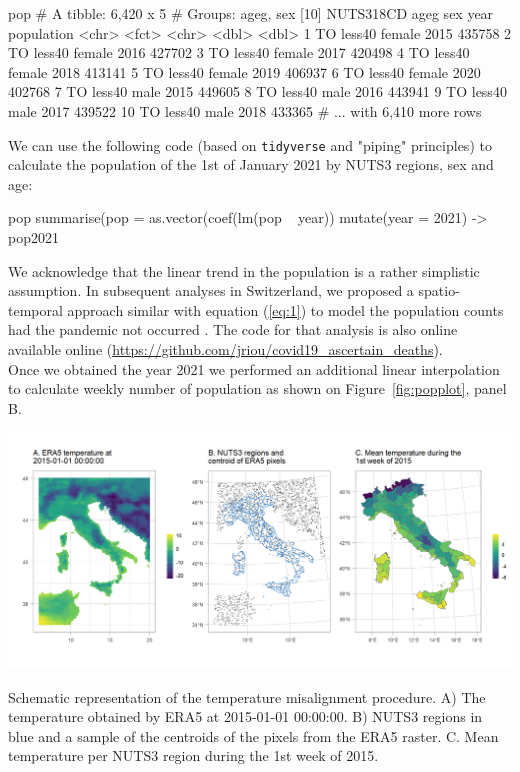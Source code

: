 \begin{example}
pop
# A tibble: 6,420 x 5
# Groups:   ageg, sex [10]
NUTS318CD ageg   sex     year population
<chr>     <fct>  <chr>  <dbl>      <dbl>
1 TO        less40 female  2015     435758
2 TO        less40 female  2016     427702
3 TO        less40 female  2017     420498
4 TO        less40 female  2018     413141
5 TO        less40 female  2019     406937
6 TO        less40 female  2020     402768
7 TO        less40 male    2015     449605
8 TO        less40 male    2016     443941
9 TO        less40 male    2017     439522
10 TO        less40 male    2018     433365
# ... with 6,410 more rows
\end{example}



We can use the following code (based on \texttt{tidyverse} and "piping" principles) to calculate the population of the 1st of January 2021 by NUTS3 regions, sex and age:
\begin{example}
pop %
	summarise(pop = as.vector(coef(lm(pop ~ year)) %
	mutate(year = 2021) -> pop2021
\end{example}

We acknowledge that the linear trend in the population is a rather simplistic assumption. In subsequent analyses in Switzerland, we proposed a spatio-temporal approach similar with equation (\ref{eq:1}) to model the population counts had the pandemic not occurred \citep{riou2023direct}. The code for that analysis is also online available online (\url{https://github.com/jriou/covid19_ascertain_deaths}).\\
Once we obtained the year 2021 we performed an additional linear interpolation to calculate weekly number of population as shown on Figure~\ref{fig:popplot}, panel B.

\begin{widefigure}[!b]
	\centering
	\includegraphics{ERAPOINTS.png}
	\caption{Schematic representation of the temperature misalignment procedure. A) The temperature obtained by ERA5 at 2015-01-01 00:00:00. B) NUTS3 regions in blue and a sample of the centroids of the pixels from the ERA5 raster. C. Mean temperature per NUTS3 region during the 1st week of 2015.}
	\label{ERA5POINTS}
\end{widefigure}

